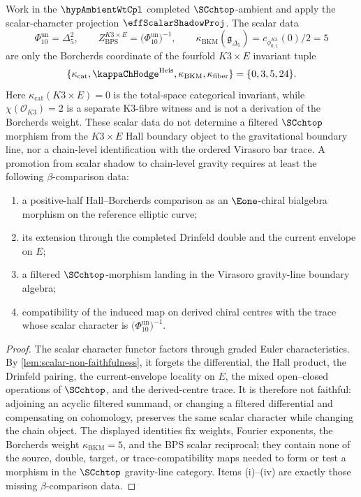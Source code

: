 \begin{proposition}
\label{prop:3dg-k3-scalar-no-promotion}
Work in the \(\hypAmbientWtCpl\) completed \(\SCchtop\)-ambient and
apply the scalar-character projection \(\effScalarShadowProj\).
The scalar data
\[
\Phi_{10}^{\mathrm{un}}=\Delta_5^2,\qquad
Z_{\mathrm{BPS}}^{K3\times E}=\bigl(\Phi_{10}^{\mathrm{un}}\bigr)^{-1},\qquad
\kappa_{\mathrm{BKM}}(\mathfrak g_{\Delta_5})
=c_{\phi_{0,1}^{K3}}(0)/2=5
\]
are only the Borcherds coordinate of the fourfold \(K3\times E\)
invariant tuple
\[
\{\kappa_{\mathrm{cat}},{\kappaChHodge}^{\mathrm{Heis}},
\kappa_{\mathrm{BKM}},\kappa_{\mathrm{fiber}}\}
=\{0,3,5,24\}.
\]
Here \(\kappa_{\mathrm{cat}}(K3\times E)=0\) is the total-space
categorical invariant, while \(\chi(\mathcal O_{K3})=2\) is a separate
K3-fibre witness and is not a derivation of the Borcherds weight.
These scalar data do not determine a filtered \(\SCchtop\) morphism from the
\(K3\times E\) Hall boundary object to the gravitational boundary
line, nor a chain-level identification with the ordered Virasoro bar
trace. A promotion from scalar shadow to chain-level gravity requires at
least the following \(\beta\)-comparison data:
\begin{enumerate}[label=\textup{(\roman*)}]
\item a positive-half Hall--Borcherds comparison as an
\(\Eone\)-chiral bialgebra morphism on the reference elliptic curve;
\item its extension through the completed Drinfeld double and the
current envelope on \(E\);
\item a filtered \(\SCchtop\)-morphism landing in the Virasoro
gravity-line boundary algebra;
\item compatibility of the induced map on derived chiral centres with
the trace whose scalar character is
\(\bigl(\Phi_{10}^{\mathrm{un}}\bigr)^{-1}\).
\end{enumerate}
\end{proposition}

\begin{proof}
The scalar character functor factors through graded Euler
characteristics. By
\cref{lem:scalar-non-faithfulness}, it forgets the differential, the
Hall product, the Drinfeld pairing, the current-envelope locality on
\(E\), the mixed open--closed operations of \(\SCchtop\), and the
derived-centre trace. It is therefore not faithful: adjoining an
acyclic filtered summand, or changing a filtered differential and
compensating on cohomology, preserves the same scalar character while
changing the chain object. The displayed identities fix weights,
Fourier exponents, the Borcherds weight
\(\kappa_{\mathrm{BKM}}=5\), and the BPS scalar reciprocal; they contain
none of the source, double, target, or trace-compatibility maps needed
to form or test a morphism in the \(\SCchtop\) gravity-line category.
Items \textup{(i)}--\textup{(iv)} are exactly those missing
\(\beta\)-comparison data.
\end{proof}


